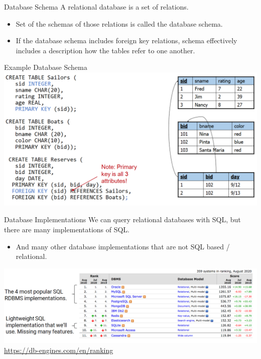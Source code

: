 \documentclass[aspectratio=169]{../latex_main/tntbeamer}  %
\begin{document}
	
	
	\begin{frame}[c]{Database Schema}
	    A relational database is a set of relations.
	    \begin{itemize}
	        \item Set of the schemas of those relations is called the database schema.
	        \item If the database schema includes foreign key relations, schema effectively includes a description how the tables refer to one another.
	    \end{itemize}
	\end{frame}
	
	
	\begin{frame}{Example Database Schema}
	    \includegraphics[scale=.4]{Bild4}
	\end{frame}
	
	
	
	
	\begin{frame}{Database Implementations}
	    We can query relational databases with SQL, but there are many implementations of SQL. 
	    \begin{itemize}
	        \item And many other database implementations that are not SQL based / relational.
	    \end{itemize}
	    \includegraphics[scale=.4]{Bild5}\\
	    \vspace{.9cm}
	    \url{https://db-engines.com/en/ranking}
	\end{frame}
\end{document}
